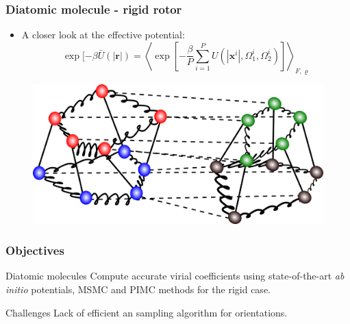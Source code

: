 \documentclass[xcolor=svgnames]{beamer}
\DeclareRobustCommand{\abinitio}[0]{\emph{ab initio}}
\DeclareRobustCommand{\mbf}[1]{{\boldsymbol {#1}}}
\begin{document}
        \begin{frame}
            \frametitle{Diatomic molecule - rigid rotor}
            \begin{itemize}
                \justifying
                \item A closer look at the effective potential: 
                \begin{equation*}
                    \exp [-\beta \bar{U} (|\mbf{r}|) = \left< \exp \left[ -\frac{\beta}{P} \sum_{i=1}^P U (|\mbf{x}^i|,\Omega_1^i,\Omega_2^i) \right] \right>_{F,\varrho}
                \end{equation*}
            \end{itemize}
            \begin{figure}
            \centering
            \includegraphics[scale=0.3,keepaspectratio]{5beadsDimerVariableOrientation.png}
            \end{figure}

        \end{frame}
        \begin{frame}
            \frametitle{Objectives}
            \begin{block}{Diatomic molecules}
                Compute accurate virial coefficients using state-of-the-art \abinitio{} potentials, MSMC and PIMC methods for the rigid case.
            \end{block}
            \begin{alertblock}{Challenges}
                Lack of efficient an sampling algorithm for orientations.
            \end{alertblock}
        \end{frame}
\end{document}
